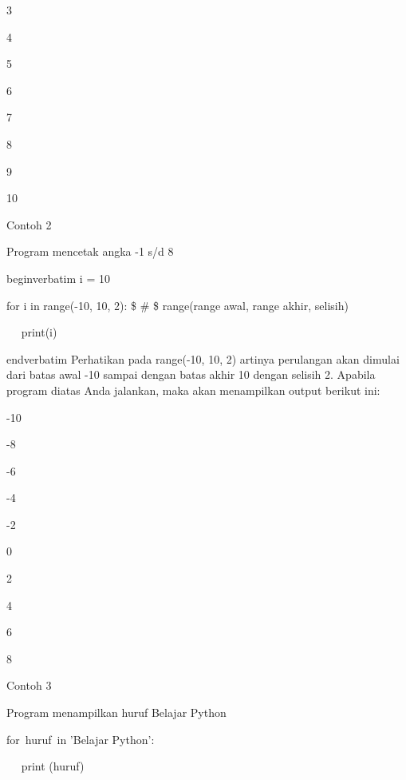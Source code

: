 3 \par
4 \par
5 \par
6 \par
7 \par
8 \par
9 \par
10 \par
\vspace{\baselineskip}
Contoh 2\vspace{\baselineskip}
\vspace{\baselineskip}
 \par
 Program mencetak angka -1 s/d 8 \par
\vspace{12pt}
begin{verbatim}
i = 10 \par
for i in range(-10, 10, 2):  \$  \#  \$ range(range awal, range akhir, selisih) \par
~~ print(i) \par
end{verbatim}
\vspace{12pt}
\vspace{\baselineskip}
Perhatikan pada range(-10, 10, 2) artinya perulangan akan dimulai dari batas awal -10 sampai dengan batas akhir 10 dengan selisih 2.\vspace{\baselineskip}
\vspace{\baselineskip}
Apabila program diatas Anda jalankan, maka akan menampilkan output berikut ini:\vspace{\baselineskip}
\vspace{\baselineskip}
 \par
-10 \par
-8 \par
-6 \par
-4 \par
-2 \par
0 \par
2 \par
4 \par
6 \par
8 \par
\vspace{\baselineskip}
Contoh 3\vspace{\baselineskip}
\vspace{\baselineskip}
 \par
Program menampilkan huruf Belajar Python \par
for~huruf~in 'Belajar Python':    \par
~~ print (huruf) \par
\vspace{\baselineskip}
